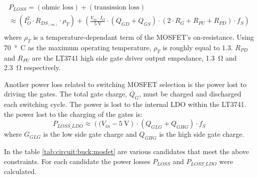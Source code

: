 \begin{multline}
    P_{LOSS} = (\textrm{ohmic loss}) + (\textrm{transission loss}) \\
             \approx \left( I_O^2 \cdot R_{DS_{(on)}} \cdot \rho_T \right)
                    + \left( \frac{V_{in} \cdot I_O}{\SI{5}{\volt}} \cdot \left(Q_{GD} + Q_{GS} \right) \cdot \left( 2 \cdot R_G + R_{PU} + R_{PD} \right) \cdot f_S \right) \\
    \label{eq:circuit:buck:mosfet_ploss}
\end{multline}
where  $\rho_T$ is a temperature-dependant term of the  MOSFET's  on-resistance.
Using \SI{70}{\degree C} as the maximum operating temperature, $\rho_T$ is
roughly  equal  to  $1.3$.  $R_{PD}$  and $R_{PU}$ are the LT3741 high side gate
driver   output   empedance,  \SI{1.3}{\ohm}  and  \SI{2.3}{\ohm}  respectively.

Another power loss related to switching MOSFET selection  is  the  power lost to
driving the gates. The total gate  charge, $Q_G$, must be charged and discharged
each switching cycle. The power is lost to the  internal  LDO within the LT3741.
the power lost to the charging of the gates is:
\begin{equation}
    P_{LOSS\_LDO} \approx \left( (V_{in} - \SI{5}{\volt} \right) \cdot \left( Q_{GLG} + Q_{GHG} \right) \cdot f_S
    \label{eq:circuit:buck:switching_loss}
\end{equation}
where $G_{GLG}$ is the low side gate charge  and $Q_{GHG}$ is the high side gate
charge.

In the table \ref{tab:circuit:buck:mosfet} are various candidates  that meet the
above  constraints.  For   each   candidate  the  power  losses  $P_{LOSS}$  and
$P_{LOSS\_LDO}$ were calculated.


